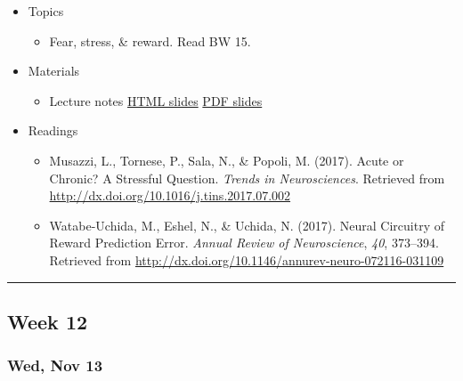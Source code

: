 \documentclass[]{article}
\providecommand{\tightlist}{%
  \setlength{\itemsep}{0pt}\setlength{\parskip}{0pt}}
\begin{document}
\begin{itemize}
\tightlist
\item
  Topics

  \begin{itemize}
  \tightlist
  \item
    Fear, stress, \& reward. Read BW 15.
  \end{itemize}
\item
  Materials

  \begin{itemize}
  \tightlist
  \item
    Lecture notes \textbar{} \href{}{HTML slides} \textbar{} \href{}{PDF
    slides}
  \end{itemize}
\item
  Readings

  \begin{itemize}
  \tightlist
  \item
    Musazzi, L., Tornese, P., Sala, N., \& Popoli, M. (2017). Acute or
    Chronic? A Stressful Question. \emph{Trends in Neurosciences}.
    Retrieved from \url{http://dx.doi.org/10.1016/j.tins.2017.07.002}
  \item
    Watabe-Uchida, M., Eshel, N., \& Uchida, N. (2017). Neural Circuitry
    of Reward Prediction Error. \emph{Annual Review of Neuroscience},
    \emph{40}, 373--394. Retrieved from
    \url{http://dx.doi.org/10.1146/annurev-neuro-072116-031109}
  \end{itemize}
\end{itemize}

\begin{center}\rule{0.5\linewidth}{\linethickness}\end{center}

\hypertarget{week-12}{%
\subsection{Week 12}\label{week-12}}

\hypertarget{wed-nov-13}{%
\subsubsection{Wed, Nov 13}\label{wed-nov-13}}
\end{document}
